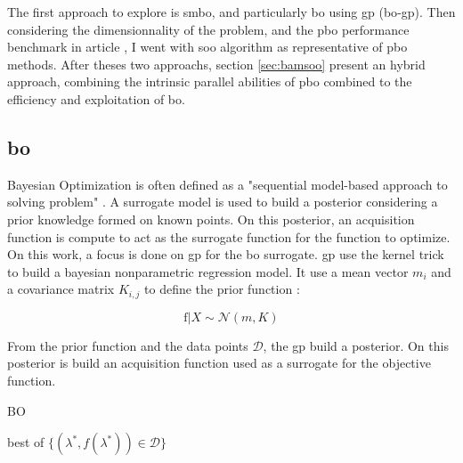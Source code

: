 The first approach to explore is \acrfull{smbo}, and particularly \acrfull{bo} using \acrfull{gp} (\acrshort{bo}-\acrshort{gp}). Then considering the dimensionnality of the problem, and the \acrshort{pbo} performance benchmark in article \cite{firmin_fractal-based_2022}, I went with \acrfull{soo} algorithm as representative of \acrshort{pbo} methods. After theses two approachs, section \ref{sec:bamsoo} present an hybrid approach, combining the intrinsic parallel abilities of \acrshort{pbo} combined to the efficiency and exploitation of \acrshort{bo}.

\subsection{\acrfull{bo}}
\label{sec:bo}

Bayesian Optimization is often defined as a "sequential model-based approach to solving problem" \cite{shahriari_taking_2016}. A surrogate model is used to build a posterior considering a prior knowledge formed on known points. On this posterior, an acquisition function is compute to act as the surrogate function for the function to optimize. On this work, a focus is done on \acrshort{gp} for the \acrshort{bo} surrogate. \acrshort{gp} use the kernel trick to build a bayesian nonparametric regression model. It use a mean vector $m_i$ and a covariance matrix $K_{i,j}$ to define the prior function : 

\begin{equation}
    \text{f} | X \sim  \mathcal N (m,K)
    \label{eq:prior_gp}
\end{equation}

From the prior function and the data points $\mathcal D$, the \acrshort{gp} build a posterior. On this posterior is build an acquisition function used as a surrogate for the objective function.

\begin{algorithm}[h]
    \caption{BO}
    \label{algo:bo}
    
    
    \Return best of $\{(\lambda^*, f(\lambda^*)) \in \mathcal{D}\}$
\end{algorithm}
    

